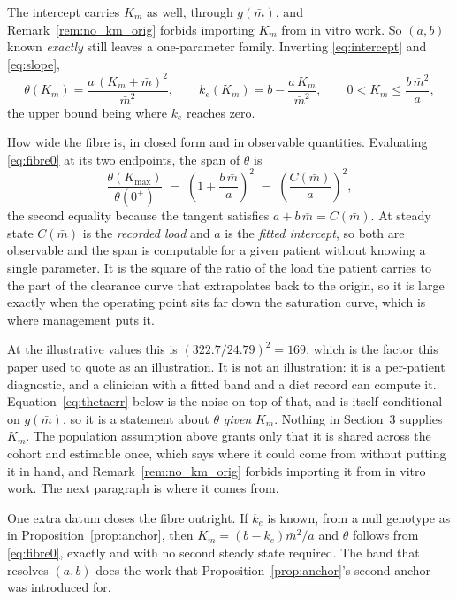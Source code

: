 \begin{remark}
\label{rem:fibre}
The intercept carries $K_m$ as well, through $g(\bar m)$, and Remark~\ref{rem:no_km_orig}
forbids importing $K_m$ from in vitro work. So $(a,b)$ known \emph{exactly} still leaves a
one-parameter family. Inverting \eqref{eq:intercept} and \eqref{eq:slope},
\begin{equation}
\theta(K_m) = \frac{a\,(K_m+\bar m)^2}{\bar m^{2}},
\qquad
k_e(K_m) = b - \frac{a\,K_m}{\bar m^{2}},
\qquad 0 < K_m \le \frac{b\,\bar m^{2}}{a},
\label{eq:fibre0}
\end{equation}
the upper bound being where $k_e$ reaches zero.

How wide the fibre is, in closed form and in observable quantities. Evaluating
\eqref{eq:fibre0} at its two endpoints, the span of $\theta$ is
\begin{equation}
\frac{\theta(K_{\max})}{\theta(0^+)}
\;=\; \left(1 + \frac{b\,\bar m}{a}\right)^{\!2}
\;=\; \left(\frac{C(\bar m)}{a}\right)^{\!2},
\label{eq:span}
\end{equation}
the second equality because the tangent satisfies $a + b\,\bar m = C(\bar m)$. At steady
state $C(\bar m)$ is the \emph{recorded load} and $a$ is the \emph{fitted intercept}, so
both are observable and the span is computable for a given patient without knowing a
single parameter. It is the square of the ratio of the load the patient carries to the part
of the clearance curve that extrapolates back to the origin, so it is large exactly when the
operating point sits far down the saturation curve, which is where management puts it.

At the illustrative values this is $(322.7/24.79)^2 = 169$, which is the factor this paper
used to quote as an illustration. It is not an illustration: it is a per-patient diagnostic,
and a clinician with a fitted band and a diet record can compute it.
Equation~\eqref{eq:thetaerr} below is the noise on top of that, and is itself conditional on
$g(\bar m)$, so it is a statement about $\theta$ \emph{given} $K_m$. Nothing in Section~3
supplies $K_m$. The population assumption above grants only that it is shared across the
cohort and
estimable once, which says where it could come from without putting it in
hand, and Remark~\ref{rem:no_km_orig} forbids importing it from in vitro work. The next paragraph
is where it comes from.

One extra datum closes the fibre outright. If $k_e$ is known, from a null genotype as in
Proposition~\ref{prop:anchor}, then $K_m = (b - k_e)\bar m^{2}/a$ and $\theta$ follows from
\eqref{eq:fibre0}, exactly and with no second steady state required. The band that resolves
$(a,b)$ does the work that Proposition~\ref{prop:anchor}'s second anchor was introduced for.
\end{remark}

